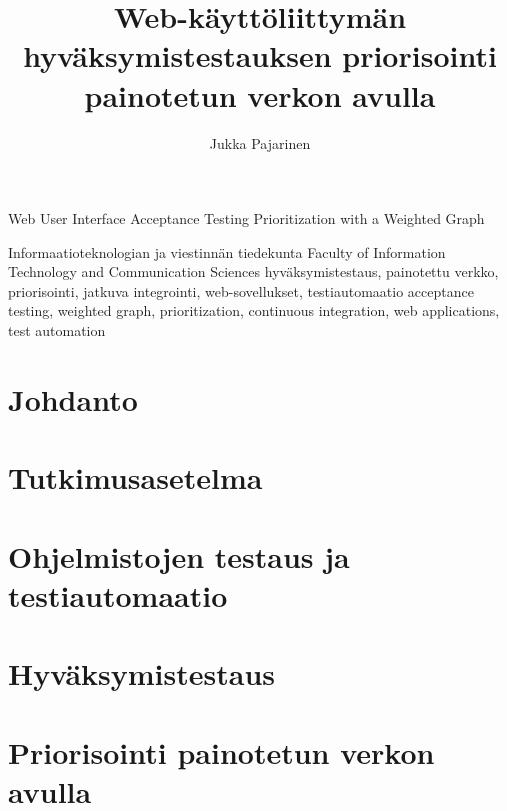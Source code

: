 \documentclass{config/tauthesis}
\numberwithin{equation}{section}
\theoremstyle{definition}
\begin{document}
\frontmatter
\title
  {Web-käyttöliittymän hyväksymistestauksen priorisointi painotetun verkon avulla}
  {Web User Interface Acceptance Testing Prioritization with a Weighted Graph}
\subtitle{}{}
\author{Jukka Pajarinen}
\facultyname
  {Informaatioteknologian ja viestinnän tiedekunta}
  {Faculty of Information Technology and Communication Sciences}
\keywords
  {hyväksymistestaus, painotettu verkko, priorisointi, jatkuva integrointi, web-sovellukset, testiautomaatio}
  {acceptance testing, weighted graph, prioritization, continuous integration, web applications, test automation}
\maketitle
{}
\tableofcontents
\glossary

\mainmatter
\chapter{Johdanto} \label{ch:05_johdanto}
  
\chapter{Tutkimusasetelma} \label{ch:06_tutkimusasetelma}
  
\chapter{Ohjelmistojen testaus ja testiautomaatio} \label{ch:07_ohjelmistojen_testaus_ja_testiautomaatio}
  
\chapter{Hyväksymistestaus} \label{ch:08_hyvaksymistestaus}
  
\chapter{Priorisointi painotetun verkon avulla} \label{ch:09_priorisointi_painotetun_verkon_avulla}
  
\end{document}

